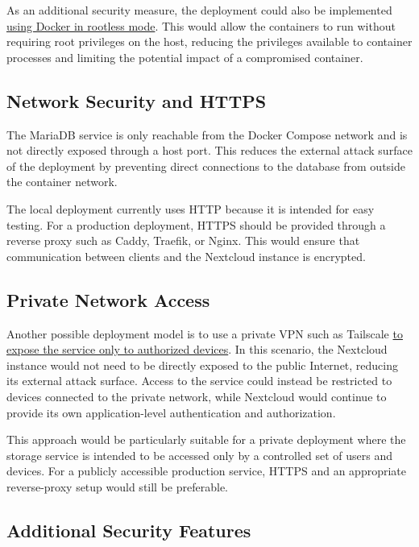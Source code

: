 \documentclass[a4paper]{article}
\begin{document}
As an additional security measure, the deployment could also be
implemented \href{https://docs.docker.com/engine/security/rootless/}
{using Docker in rootless mode}. This would allow the
containers to run without requiring root privileges on the host,
reducing the privileges available to container processes and limiting
the potential impact of a compromised container.

\subsection{Network Security and HTTPS}

The MariaDB service is only reachable from the Docker Compose network
and is not directly exposed through a host port. This reduces the
external attack surface of the deployment by preventing direct
connections to the database from outside the container network.

The local deployment currently uses HTTP because it is intended for
easy testing. For a production deployment, HTTPS should be provided
through a reverse proxy such as Caddy, Traefik, or Nginx. This would
ensure that communication between clients and the Nextcloud instance
is encrypted.

\subsection{Private Network Access}

Another possible deployment model is to use a private VPN such as
Tailscale
\href{https://tailscale.com/docs/features/tailscale-serve}{to expose
the service only to authorized devices}. In this scenario, the
Nextcloud instance would not need to be directly exposed to the public
Internet, reducing its external attack surface. Access to the service
could instead be restricted to devices connected to the private
network, while Nextcloud would continue to provide its own
application-level authentication and authorization.

This approach would be particularly suitable for a private deployment
where the storage service is intended to be accessed only by a
controlled set of users and devices. For a publicly accessible
production service, HTTPS and an appropriate reverse-proxy setup would
still be preferable.

\subsection{Additional Security Features}
\end{document}
